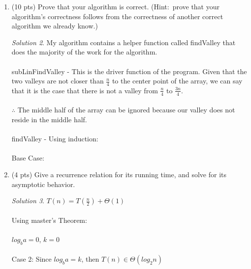 \documentclass[12pt]{article}
\theoremstyle{remark}
\newtheorem*{solution}{Solution}
\begin{document}
\begin{enumerate}
\begin{enumerate}
\begin{solution}
\begin{verbatim}
def subLinFindValley(A):
   n = len(A) - 1
   low = A[0. . . n / 4]
   high = A[3n/4 . . . n]
   
   return max(findValley(low,0,len(low)-1), findValley(high,0,len(high)-1))
   
   
   
\end{verbatim}
        \end{solution}
        \pagebreak

	    \item (10 pts) Prove that your algorithm is correct. (Hint:\ prove that your algorithm's correctness follows from the correctness of another correct algorithm we already know.)
	    \begin{solution}
    My algorithm contains a helper function called findValley that does the majority of the work for the algorithm. \\ \\
subLinFindValley - This is the driver function of the program. Given that the two valleys are not closer than $\frac{n}{4}$ to the center point of the array, we can say that it is the case that there is not a valley from $\frac{n}{4}$ to $\frac{3n}{4}$. \\ \\ 
$\therefore$ The middle half of the array can be ignored because our valley does not reside in the middle half. \\ \\
findValley - Using induction: \\ \\
Base Case: 
        \end{solution}
        \pagebreak

	    \item (4 pts) Give a recurrence relation for its running time, and solve for its asymptotic behavior.
	   \begin{solution}
    $T(n) = T(\frac{n}{2}) + \Theta(1)$ \\ \\
Using master's Theorem: \\ \\
$log_{b}a = 0$, $k=0$ \\ \\
Case 2: Since $log_{b}a = k$, then $T(n) \in \Theta(log_{2}n)$
        \end{solution}
        \pagebreak

	\end{enumerate}


\end{enumerate}
\end{document}
